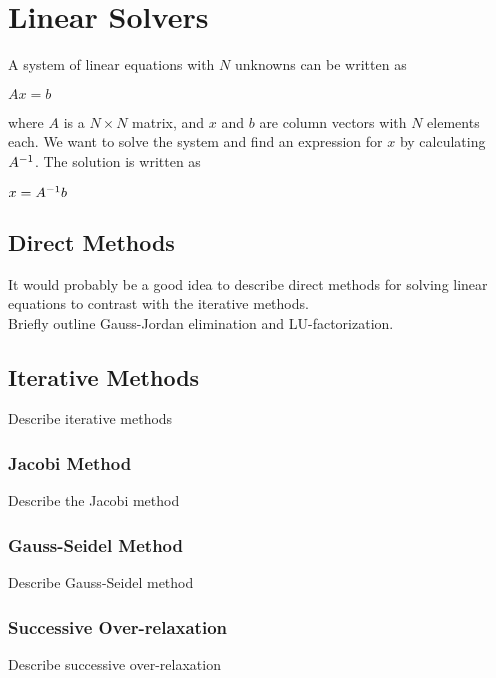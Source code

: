 \section*{Linear Solvers}

A system of linear equations with $N$ unknowns can be written as 

$Ax = b$

where $A$ is a $N \times N$ matrix, and $x$ and $b$ are column vectors with $N$ 
elements each. We want to solve the system and find an expression for $x$ by calculating
${A}^{-1}$. The solution is written as 

$x = {A}^{-1}b$

\subsection*{Direct Methods}

It would probably be a good idea to describe direct methods for solving linear equations to contrast with the iterative methods. \\
Briefly outline Gauss-Jordan elimination and LU-factorization. 

\subsection*{Iterative Methods}

Describe iterative methods

\subsubsection*{Jacobi Method}

Describe the Jacobi method

\subsubsection*{Gauss-Seidel Method}

Describe Gauss-Seidel method

\subsubsection*{Successive Over-relaxation}

Describe successive over-relaxation
